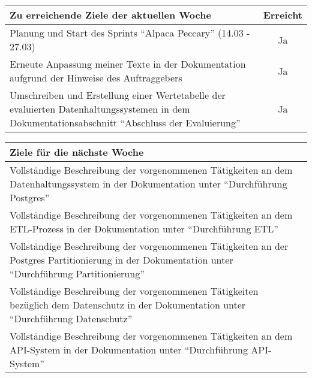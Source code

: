 \begin{tabularx}{\textwidth}{Xc}
    \arrayrulecolor{OliveGreen}
    \toprule
    {\bfseries Zu erreichende Ziele der aktuellen Woche} & {\bfseries Erreicht} \\
    \midrule[2pt]
    Planung und Start des Sprints ``Alpaca Peccary'' (14.03 - 27.03)  &  Ja  \\
    \rowcolor{OliveGreen!15}
    Erneute Anpassung meiner Texte in der Dokumentation aufgrund der Hinweise
    des Auftraggebers  &  Ja  \\
    \rowcolor{White}
    Umschreiben und Erstellung einer Wertetabelle der evaluierten
    Datenhaltungssystemen in dem Dokumentationsabschnitt
    ``Abschluss der Evaluierung''  &  Ja  \\
    \bottomrule[2pt]
\end{tabularx}
%
\vspace{1cm}
%
\begin{tabularx}{\textwidth}{Xc}
    \arrayrulecolor{OliveGreen}
    \toprule
    {\bfseries Ziele für die nächste Woche}              &                      \\
    \midrule[2pt]
    Vollständige Beschreibung der vorgenommenen Tätigkeiten an dem
    Datenhaltungssystem in der Dokumentation unter
    ``Durchführung Postgres''  &  \\
    \rowcolor{OliveGreen!15}
    Vollständige Beschreibung der vorgenommenen Tätigkeiten an dem
    ETL-Prozess in der Dokumentation unter
    ``Durchführung ETL''  &  \\
    \rowcolor{White}
    Vollständige Beschreibung der vorgenommenen Tätigkeiten an der
    Postgres Partitionierung in der Dokumentation unter
    ``Durchführung Partitionierung''  &  \\
    \rowcolor{OliveGreen!15}
    Vollständige Beschreibung der vorgenommenen Tätigkeiten bezüglich dem
    Datenschutz in der Dokumentation unter
    ``Durchführung Datenschutz''  &  \\
    \rowcolor{White}
    Vollständige Beschreibung der vorgenommenen Tätigkeiten an dem
    API-System in der Dokumentation unter
    ``Durchführung API-System''  &  \\
\end{tabularx}
